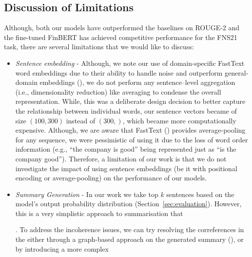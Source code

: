 \subsection{Discussion of Limitations}\label{subsec:limitations}
Although, both our models have outperformed the baselines on ROUGE-2 and the fine-tuned FinBERT has achieved competitive
performance for the FNS21 task, there are several limitations that we would like to discuss:
\begin{itemize}
    \item \emph{Sentence embedding} - Although, we note our use of domain-specific FastText word embeddings due to their
    ability to handle noise and outperform general-domain embeddings (\cite{rahimikia2021realised}), we do not perform
    any sentence--level aggregation (i.e., dimensionality reduction) like averaging to condense the overall representation.
    While, this was a deliberate design decision to better capture the relationship between individual words,
    our sentence vectors became of size $(100, 300)$ instead of $(300,)$, which became more computationally expensive.
    Although, we are aware that FastText (\cite{bojanowski-etal-2017-enriching}) provides average-pooling for any sequence,
    we were pessimistic of using it due to the loss of word order information (e.g., ``the company is good'' being represented just as ``is the company good'').
    Therefore, a limitation of our work is that we do not investigate the impact of using sentence embeddings
    (be it with positional encoding or average-pooling) on the performance of our models.
    \item \emph{Summary Generation} - In our work we take top $k$ sentences based on the model's output probability distribution (Section~\ref{sec:evaluation}).
        However, this is a very simplistic approach to summarisation that
        .
        To address the incoherence issues, we can try resolving the correferences in the either through a
        graph-based approach on the generated summary (\cite{sonawane2016coreference}), or by introducing a more complex

\end{itemize}
